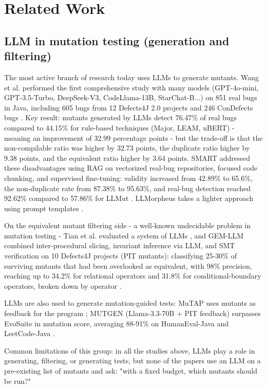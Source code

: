 \section{Related Work}

\subsection{LLM in mutation testing (generation and filtering)}

The most active branch of research today uses LLMs to generate mutants. Wang et al. performed the first comprehensive study with many models (GPT-4o-mini, GPT-3.5-Turbo, DeepSeek-V3, CodeLlama-13B, StarChat-B...) on 851 real bugs in Java, including 605 bugs from 12 Defects4J 2.0 projects and 246 ConDefects bugs \cite{wang2025comprehensive}. Key result: mutants generated by LLMs detect 76.47\% of real bugs compared to 44.15\% for rule-based techniques (Major, LEAM, uBERT) - meaning an improvement of 32.99 percentage points - but the trade-off is that the non-compilable ratio was higher by 32.73 points, the duplicate ratio higher by 9.38 points, and the equivalent ratio higher by 3.64 points. SMART addressed these disadvantages using RAG on vectorized real-bug repositories, focused code chunking, and supervised fine-tuning: validity increased from 42.89\% to 65.6\%, the non-duplicate rate from 87.38\% to 95.63\%, and real-bug detection reached 92.62\% compared to 57.86\% for LLMut \cite{wang2026smart}. LLMorpheus takes a lighter approach using prompt templates \cite{tian2025leamplusplus}.

On the equivalent mutant filtering side - a well-known undecidable problem in mutation testing - Tian et al. evaluated a system of LLMs \cite{tian2024equivalent}, and GEM-LLM combined inter-procedural slicing, invariant inference via LLM, and SMT verification on 10 Defects4J projects (PIT mutants): classifying 25-30\% of surviving mutants that had been overlooked as equivalent, with 98\% precision, reaching up to 34.2\% for relational operators and 31.8\% for conditional-boundary operators, broken down by operator \cite{tanhaei2025gemllm}.

LLMs are also used to generate mutation-guided tests: MuTAP uses mutants as feedback for the program \cite{dakhel2024mutap}; MUTGEN (Llama-3.3-70B + PIT feedback) surpasses EvoSuite in mutation score, averaging 88-91\% on HumanEval-Java and LeetCode-Java \cite{wang2026mutgen}.

Common limitations of this group: in all the studies above, LLMs play a role in generating, filtering, or generating tests, but none of the papers use an LLM on a pre-existing list of mutants and ask: "with a fixed budget, which mutants should be run?"

